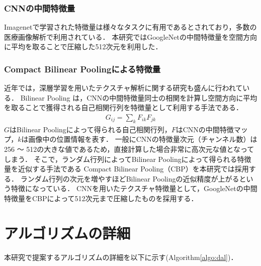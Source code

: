 \subsubsection{\textbf{CNN}の中間特徴量}
Imagenetで学習された特徴量は様々なタスクに有用であるとされており，多数の医療画像解析で利用されている．
本研究ではGoogleNet\cite{szegedy2015going}の中間特徴量を空間方向に平均を取ることで圧縮した512次元を利用した．

\subsubsection{\textbf{Compact Bilinear Pooling}による特徴量}
近年では，深層学習を用いたテクスチャ解析に関する研究も盛んに行われている．
Bilinear Pooling \cite{lin2015bilinear}は，CNNの中間特徴量同士の相関を計算し空間方向に平均を取ることで獲得される自己相関行列を特徴量として利用する手法である．
\begin{eqnarray}
G_{ij} = \sum_k{F_{ik} F_{jk}}
\end{eqnarray}
$G$はBilinear Poolingによって得られる自己相関行列，$F$はCNNの中間特徴マップ，$k$は画像中の位置情報を表す．
一般にCNNの特徴量次元（チャンネル数）は256 〜 512の大きな値であるため，直接計算した場合非常に高次元な値となってしまう．
そこで，ランダム行列によってBilinear Poolingによって得られる特徴量を近似する手法である
Compact Bilinear Pooling（CBP）\cite{gao2016compact}を本研究では採用する．
ランダム行列の次元を増やすほどBilinear Poolingの近似精度が上がるという特徴になっている．
CNNを用いたテクスチャ特徴量として，GoogleNet\cite{szegedy2015going}の中間特徴量をCBPによって512次元まで圧縮したものを採用する．

\section{アルゴリズムの詳細}

本研究で提案するアルゴリズムの詳細を以下に示す(Algorithm\ref{algo:dal})．

